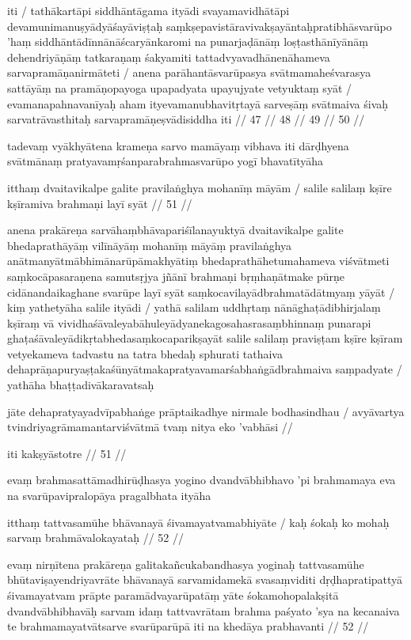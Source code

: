 iti  / tathākartāpi siddhāntāgama ityādi svayamavidhātāpi devamunimanuṣyādyāśayāviṣṭaḥ saṃkṣepavistāravivakṣayāntaḥpratibhāsvarūpo 'haṃ siddhāntādīnnānāścaryānkaromi na punarjaḍānāṃ loṣṭasthānīyānāṃ dehendriyāṇāṃ tatkaraṇaṃ śakyamiti tattadvyavadhānenāhameva sarvapramāṇanirmāteti  / anena parāhantāsvarūpasya svātmamaheśvarasya sattāyāṃ na pramāṇopayoga upapadyata upayujyate vetyuktaṃ syāt  / evamanapahnavanīyaḥ aham ityevamanubhavitṛtayā sarveṣāṃ svātmaiva śivaḥ sarvatrāvasthitaḥ sarvapramāṇeṣvādisiddha iti  // 47  // 48  // 49  // 50  //

tadevaṃ vyākhyātena krameṇa sarvo mamāyaṃ vibhava iti dārḍhyena svātmānaṃ pratyavamṛśanparabrahmasvarūpo yogī bhavatītyāha

itthaṃ dvaitavikalpe galite pravilaṅghya mohanīṃ māyām  /
salile salilaṃ kṣīre kṣīramiva brahmaṇi layī syāt  // 51  //

anena prakāreṇa sarvāhaṃbhāvapariśīlanayuktyā dvaitavikalpe galite bhedaprathāyāṃ vilīnāyāṃ mohanīṃ māyāṃ pravilaṅghya anātmanyātmābhimānarūpāmakhyātiṃ bhedaprathāhetumahameva viśvātmeti saṃkocāpasaraṇena samutsṛjya jñānī brahmaṇi bṛṃhaṇātmake pūrṇe cidānandaikaghane svarūpe layī syāt saṃkocavilayādbrahmatādātmyaṃ yāyāt  / kiṃ yathetyāha salile ityādi  / yathā salilam uddhṛtaṃ nānāghaṭādibhirjalaṃ kṣīraṃ vā vividhaśāvaleyabāhuleyādyanekagosahasrasaṃbhinnaṃ punarapi ghaṭaśāvaleyādikṛtabhedasaṃkocaparikṣayāt salile salilaṃ praviṣṭam kṣīre kṣīram vetyekameva tadvastu na tatra bhedaḥ sphurati tathaiva dehaprāṇapuryaṣṭakaśūnyātmakapratyavamarśabhaṅgādbrahmaiva saṃpadyate  / yathāha bhaṭṭadivākaravatsaḥ

jāte dehapratyayadvīpabhaṅge prāptaikadhye nirmale bodhasindhau  /
avyāvartya tvindriyagrāmamantarviśvātmā tvaṃ nitya eko 'vabhāsi  //

iti kakṣyāstotre  // 51  //

evaṃ brahmasattāmadhirūḍhasya yogino dvandvābhibhavo 'pi brahmamaya eva na svarūpavipralopāya pragalbhata ityāha

itthaṃ tattvasamūhe bhāvanayā śivamayatvamabhiyāte  /
kaḥ śokaḥ ko mohaḥ sarvaṃ brahmāvalokayataḥ  // 52  //

evaṃ nirṇītena prakāreṇa galitakañcukabandhasya yoginaḥ tattvasamūhe bhūtaviṣayendriyavrāte bhāvanayā sarvamidamekā svasaṃviditi dṛḍhapratipattyā śivamayatvam prāpte paramādvayarūpatāṃ yāte śokamohopalakṣitā dvandvābhibhavāḥ sarvam idaṃ tattvavrātam brahma paśyato 'sya na kecanaiva te brahmamayatvātsarve svarūparūpā iti na khedāya prabhavanti  // 52  //

